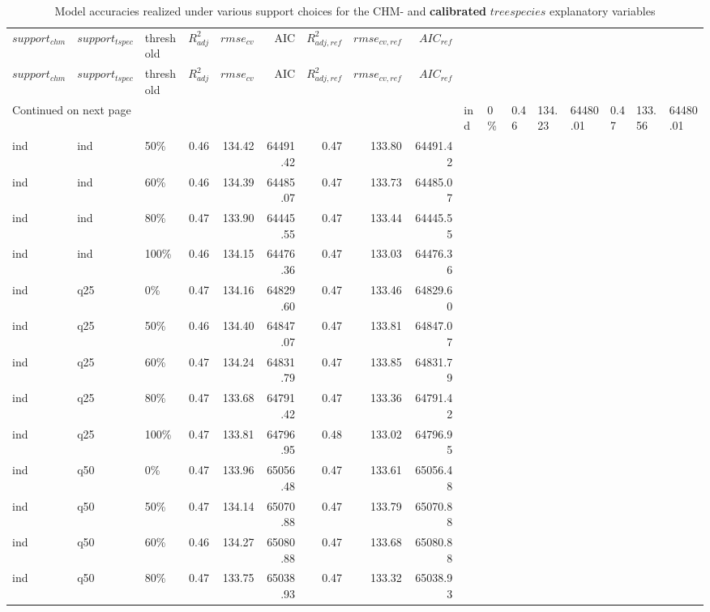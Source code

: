 \begingroup\fontsize{9pt}{10pt}\selectfont
\begin{longtable}{lllrrrrrr}
\caption{Model accuracies realized under various 
                       support choices for the CHM- and \textbf{calibrated} $treespecies$ 
                       explanatory variables}\\ \\
\hline
$support_{chm}$ & $support_{tspec}$ & threshold & $R^2_{adj}$ & $rmse_{cv}$ & AIC & $R^2_{adj, ref}$ & $rmse_{cv, ref}$ & $AIC_{ref}$ \\ 
  \hline
\endfirsthead
  \hline
$support_{chm}$ & $support_{tspec}$ & threshold & $R^2_{adj}$ & $rmse_{cv}$ & AIC & $R^2_{adj, ref}$ & $rmse_{cv, ref}$ & $AIC_{ref}$ \\ 
  \hline
\endhead
\hline
\multicolumn{9}{l}{\footnotesize Continued on next page}
\endfoot
\endlastfoot
ind & ind & 0\% & 0.46 & 134.23 & 64480.01 & 0.47 & 133.56 & 64480.01 \\ 
  ind & ind & 50\% & 0.46 & 134.42 & 64491.42 & 0.47 & 133.80 & 64491.42 \\ 
  ind & ind & 60\% & 0.46 & 134.39 & 64485.07 & 0.47 & 133.73 & 64485.07 \\ 
  ind & ind & 80\% & 0.47 & 133.90 & 64445.55 & 0.47 & 133.44 & 64445.55 \\ 
  ind & ind & 100\% & 0.46 & 134.15 & 64476.36 & 0.47 & 133.03 & 64476.36 \\ 
  ind & q25 & 0\% & 0.47 & 134.16 & 64829.60 & 0.47 & 133.46 & 64829.60 \\ 
  ind & q25 & 50\% & 0.46 & 134.40 & 64847.07 & 0.47 & 133.81 & 64847.07 \\ 
  ind & q25 & 60\% & 0.47 & 134.24 & 64831.79 & 0.47 & 133.85 & 64831.79 \\ 
  ind & q25 & 80\% & 0.47 & 133.68 & 64791.42 & 0.47 & 133.36 & 64791.42 \\ 
  ind & q25 & 100\% & 0.47 & 133.81 & 64796.95 & 0.48 & 133.02 & 64796.95 \\ 
  ind & q50 & 0\% & 0.47 & 133.96 & 65056.48 & 0.47 & 133.61 & 65056.48 \\ 
  ind & q50 & 50\% & 0.47 & 134.14 & 65070.88 & 0.47 & 133.79 & 65070.88 \\ 
  ind & q50 & 60\% & 0.46 & 134.27 & 65080.88 & 0.47 & 133.68 & 65080.88 \\ 
  ind & q50 & 80\% & 0.47 & 133.75 & 65038.93 & 0.47 & 133.32 & 65038.93 \\ 

\end{longtable}
